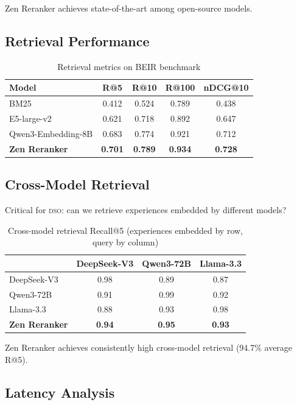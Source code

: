 \documentclass[11pt,letterpaper]{article}
\newcommand{\DSO}{\textsc{dso}}
\begin{document}
Zen Reranker achieves state-of-the-art among open-source models.

\subsection{Retrieval Performance}

\begin{table}[h]
\centering
\caption{Retrieval metrics on BEIR benchmark}
\label{tab:retrieval}
\begin{tabular}{lcccc}
\toprule
\textbf{Model} & \textbf{R@5} & \textbf{R@10} & \textbf{R@100} & \textbf{nDCG@10} \\
\midrule
BM25 & 0.412 & 0.524 & 0.789 & 0.438 \\
E5-large-v2 & 0.621 & 0.718 & 0.892 & 0.647 \\
Qwen3-Embedding-8B & 0.683 & 0.774 & 0.921 & 0.712 \\
\textbf{Zen Reranker} & \textbf{0.701} & \textbf{0.789} & \textbf{0.934} & \textbf{0.728} \\
\bottomrule
\end{tabular}
\end{table}

\subsection{Cross-Model Retrieval}

Critical for \DSO{}: can we retrieve experiences embedded by different models?

\begin{table}[h]
\centering
\caption{Cross-model retrieval Recall@5 (experiences embedded by row, query by column)}
\label{tab:crossmodel}
\begin{tabular}{lccc}
\toprule
 & \textbf{DeepSeek-V3} & \textbf{Qwen3-72B} & \textbf{Llama-3.3} \\
\midrule
DeepSeek-V3 & 0.98 & 0.89 & 0.87 \\
Qwen3-72B & 0.91 & 0.99 & 0.92 \\
Llama-3.3 & 0.88 & 0.93 & 0.98 \\
\textbf{Zen Reranker} & \textbf{0.94} & \textbf{0.95} & \textbf{0.93} \\
\bottomrule
\end{tabular}
\end{table}

Zen Reranker achieves consistently high cross-model retrieval (94.7\% average R@5).

\subsection{Latency Analysis}
\end{document}
